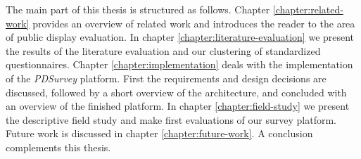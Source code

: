 	The main part of this thesis is structured as follows. Chapter \ref{chapter:related-work} provides an overview of related work and introduces the reader to the area of public display evaluation. In chapter \ref{chapter:literature-evaluation} we present the results of the literature evaluation and our clustering of standardized questionnaires. Chapter \ref{chapter:implementation} deals with the implementation of the \textit{PDSurvey} platform. First the requirements and design decisions are discussed, followed by a short overview of the architecture, and concluded with an overview of the finished platform. In chapter \ref{chapter:field-study} we present the descriptive field study and make first evaluations of our survey platform. Future work is discussed in chapter \ref{chapter:future-work}. A conclusion complements this thesis.










